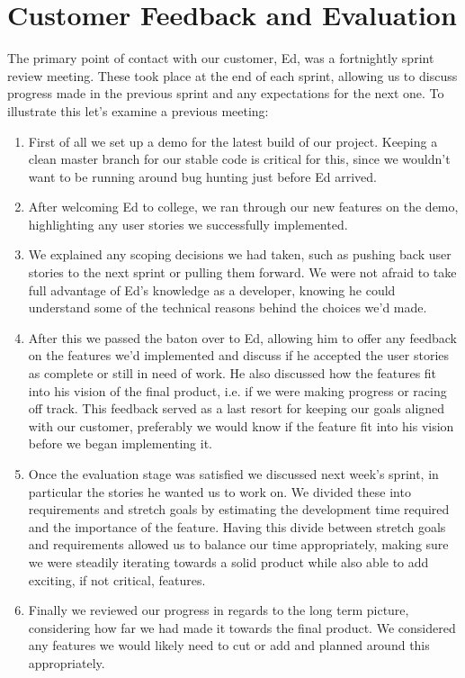 \section{Customer Feedback and Evaluation}
The primary point of contact with our customer, Ed, was a fortnightly sprint review meeting. These took place at the end of each sprint, allowing us to discuss progress made in the previous sprint and any expectations for the next one. To illustrate this let's examine a previous meeting:
\begin{enumerate}
\item First of all we set up a demo for the latest build of our project. Keeping a clean master branch for our stable code is critical for this, since we wouldn't want to be running around bug hunting just before Ed arrived.
\item After welcoming Ed to college, we ran through our new features on the demo, highlighting any user stories we successfully implemented. 
\item We explained any scoping decisions we had taken, such as pushing back user stories to the next sprint or pulling them forward. We were not afraid to take full advantage of Ed's knowledge as a developer, knowing he could understand some of the technical reasons behind the choices we'd made. 
\item  After this we passed the baton over to Ed, allowing him to offer any feedback on the features we'd implemented and discuss if he accepted the user stories as complete or still in need of work. He also discussed how the features fit into his vision of the final product, i.e. if we were making progress or racing off track. This feedback served as a last resort for keeping our goals aligned with our customer, preferably we would know if the feature fit into his vision before we began implementing it.
\item Once the evaluation stage was satisfied we discussed next week's sprint, in particular the stories he wanted us to work on. We divided these into requirements and stretch goals by estimating the development time required and the importance of the feature. Having this divide between stretch goals and requirements allowed us to balance our time appropriately, making sure we were steadily iterating towards a solid product while also able to add exciting, if not critical, features.
\item Finally we reviewed our progress in regards to the long term picture, considering how far we had made it towards the final product. We considered any features we would likely need to cut or add and planned around this appropriately.
\end{enumerate}


